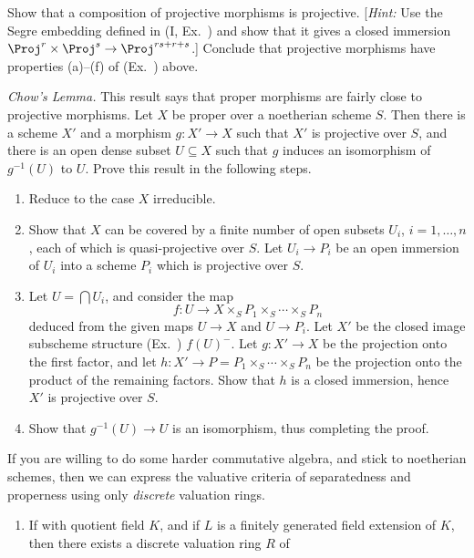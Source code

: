 {\begin{description}[leftmargin=2.4em,labelindent=0pt,topsep=4pt,itemsep=4pt,parsep=0pt]
\item[\hypertarget{ex-II-4.9}{}\textbf{4.9.}] Show that a composition of projective morphisms is projective. [\emph{Hint:} Use the Segre embedding defined in (I, Ex.~) and show that it gives a closed immersion $\Proj^r\times\Proj^s\to\Proj^{rs+r+s}$.] Conclude that projective morphisms have properties (a)--(f) of (Ex.~) above.

\item[\hypertarget{ex-II-4.10}{}\textbf{*4.10.}] \emph{Chow's Lemma.} This result says that proper morphisms are fairly close to projective morphisms. Let $X$ be proper over a noetherian scheme $S$. Then there is a scheme $X'$ and a morphism $g\colon X'\to X$ such that $X'$ is projective over $S$, and there is an open dense subset $U\subseteq X$ such that $g$ induces an isomorphism of $g^{-1}(U)$ to $U$. Prove this result in the following steps.
\begin{enumerate}[label=(\alph*),leftmargin=1.6em,nosep]
\item Reduce to the case $X$ irreducible.
\item Show that $X$ can be covered by a finite number of open subsets $U_i$, $i=1,\ldots,n$, each of which is quasi-projective over $S$. Let $U_i\to P_i$ be an open immersion of $U_i$ into a scheme $P_i$ which is projective over $S$.
\item Let $U=\bigcap U_i$, and consider the map
\[
f\colon U\to X\times_S P_1\times_S\cdots\times_S P_n
\]
deduced from the given maps $U\to X$ and $U\to P_i$. Let $X'$ be the closed image subscheme structure (Ex.~) $f(U)^{-}$. Let $g\colon X'\to X$ be the projection onto the first factor, and let $h\colon X'\to P=P_1\times_S\cdots\times_S P_n$ be the projection onto the product of the remaining factors. Show that $h$ is a closed immersion, hence $X'$ is projective over $S$.
\item Show that $g^{-1}(U)\to U$ is an isomorphism, thus completing the proof.
\end{enumerate}

\item[\hypertarget{ex-II-4.11}{}\textbf{4.11.}] If you are willing to do some harder commutative algebra, and stick to noetherian schemes, then we can express the valuative criteria of separatedness and properness using only \emph{discrete} valuation rings.
\begin{enumerate}[label=(\alph*),leftmargin=1.6em,nosep]
\item If \hypertarget{err-II-4-11a}{} with quotient field $K$, and if $L$ is a finitely generated field extension of $K$, then there exists a discrete valuation ring $R$ of
\end{enumerate}
\end{description}
}
